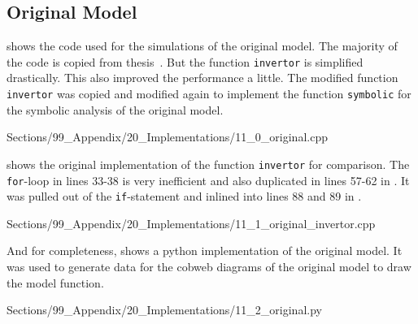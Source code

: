 \subsection{Original Model}

 shows the code used for the simulations of the original model.
The majority of the code is copied from  thesis~\cite{akyuz2022}.
But the function \texttt{invertor} is simplified drastically.
This also improved the performance a little.
The modified function \texttt{invertor} was copied and modified again to implement the function \texttt{symbolic} for the symbolic analysis of the original model.


{Sections/99_Appendix/20_Implementations/11_0_original.cpp}

 shows the original implementation of the function \texttt{invertor} for comparison.
The \texttt{for}-loop in lines 33-38 is very inefficient and also duplicated in lines 57-62 in .
It was pulled out of the \texttt{if}-statement and inlined into lines 88 and 89 in .


{Sections/99_Appendix/20_Implementations/11_1_original_invertor.cpp}

And for completeness,  shows a python implementation of the original model.
It was used to generate data for the cobweb diagrams of the original model to draw the model function.


{Sections/99_Appendix/20_Implementations/11_2_original.py}
